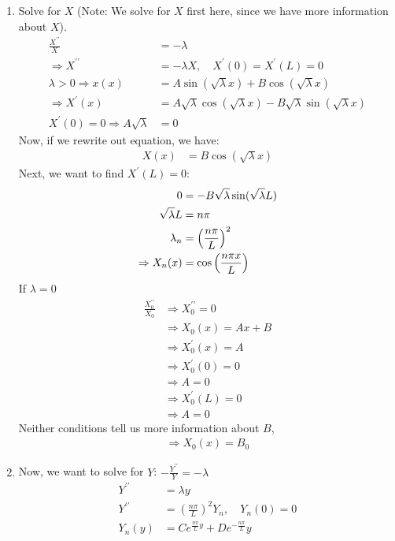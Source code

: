 \begin{enumerate}
  \item Solve for $X$ (Note: We solve for $X$ first here, since we have more information about $X$).
  \begin{align}
    \frac{X^{\prime\prime}}{X} & = - \lambda\\
    \Rightarrow X^{\prime\prime} & = - \lambda X, \quad X^\prime(0) = X^\prime(L) = 0\\
    \lambda > 0 \Rightarrow x(x) & = A \sin(\sqrt \lambda x) + B \cos(\sqrt \lambda x)\\
    \Rightarrow X^\prime(x) & = A \sqrt \lambda \cos(\sqrt \lambda x) - B \sqrt \lambda \sin(\sqrt \lambda x)\\
    X^\prime(0) = 0 \Rightarrow A \sqrt \lambda & = 0
  \end{align}
Now, if we rewrite out equation, we have:
\begin{align}
  X(x) & = B \cos(\sqrt \lambda x)
\end{align}
Next, we want to find $X^\prime(L) = 0$:
\begin{align}
  0 & = - B \sqrt \lambda \sin(\sqrt \lambda L)\\
  \sqrt \lambda L & = n \pi\\
  \lambda_n & = \left(\frac{n \pi}{L}\right)^2\\
  \Rightarrow X_n(x) & = \cos \Big( \frac{n \pi x}{L} \Big)
\end{align}
If $\lambda = 0$
\begin{align}
  \frac{X^{\prime\prime}_0}{X_0} & \Rightarrow X^{\prime\prime}_0 = 0\\
  & \Rightarrow X_0(x) = Ax + B\\
  & \Rightarrow X^\prime_0(x) = A\\
  & \Rightarrow X^\prime_0(0) = 0\\
  & \Rightarrow A = 0\\
  & \Rightarrow X^\prime_0(L) = 0\\
  & \Rightarrow A = 0
\end{align}
Neither conditions tell us more information about $B$,
\begin{align}
  \Rightarrow X_0(x) = B_0
\end{align}
\item Now, we want to solve for $Y$: $- \frac{Y^{\prime\prime}}{Y} = -\lambda$
\begin{align}
  Y^{\prime\prime} & = \lambda y\\
  Y^{\prime\prime} & = \left( \frac{n \pi}{L} \right)^2 Y_n, \quad Y_n(0) = 0\\
  Y_n(y) & = Ce^{\frac{n \pi}{L}y} + De^{- \frac{n \pi}{L}}y\\

\end{align}
\end{enumerate}
